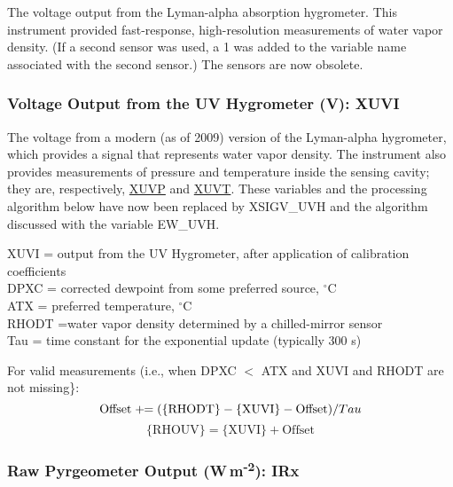\documentclass[
  english,
]{book}
\begin{document}
The voltage output from the Lyman-alpha absorption hygrometer. This instrument provided fast-response, high-resolution measurements of water vapor density. (If a second sensor was used, a 1 was added to the variable name associated with the second sensor.) The sensors are now obsolete.

\hypertarget{xuvi}{%
\subsubsection*{Voltage Output from the UV Hygrometer (V): XUVI}\label{xuvi}}

The voltage from a modern (as of 2009) version of the Lyman-alpha hygrometer, which provides a signal that represents water vapor density. The instrument also provides measurements of pressure and temperature inside the sensing cavity; they are, respectively, \underline{XUVP} and \underline{XUVT}. These variables and the processing algorithm below have now been replaced by XSIGV\_UVH and the algorithm discussed with the variable EW\_UVH.

\newcommand{\pluseq}{\mathrel{+}\mathrel{\mkern-1mu}=}

XUVI = output from the UV Hygrometer, after application of calibration
coefficients\\
DPXC = corrected dewpoint from some preferred source,
\(^{\circ}\)C\\
ATX = preferred temperature, \(^{\circ}\)C\\
RHODT =water vapor density determined by a chilled-mirror
sensor\\
Tau = time constant for the exponential update (typically 300 s)

For valid measurements (i.e., when DPXC \(<\) ATX and XUVI and RHODT are not missing\}:\\
\begin{equation}
\mathrm{Offset}\mathrel{+}\mathrel{\mkern-1mu}=(\mathrm{\{RHODT\}-\{XUVI\}-Offset})/Tau
\label{eq:RHOUVbox1}
\end{equation}
\begin{equation}
\mathrm{\{RHOUV\} = \{XUVI\} + Offset}
\label{eq:RHOUBbox2}
\end{equation}

\hypertarget{irx}{%
\subsubsection*{\texorpdfstring{Raw Pyrgeometer Output (W m\textsuperscript{-2}): IRx}{Raw Pyrgeometer Output (W m-2): IRx}}\label{irx}}
\end{document}
